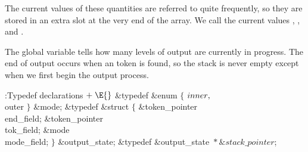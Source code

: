 \yskip\noindent The current values of these quantities are referred to
quite frequently, so they are stored in an extra slot at the very end of
the  array.  We call the current values , , and
.

The global variable  tells how many levels of output are
currently in progress. The end of output occurs when an 
token is found, so the stack is never empty except when we first begin the
output process.

\Y\B\4:Typedef declarations\X${}\mathrel+\E{}$\6
\&{typedef} \&{enum} ${}\{{}$\1\6
${}\\{inner},{}$%
\6
\\{outer}\2\6
${}\}{}$ \&{mode};\6
\&{typedef} \&{struct} ${}\{{}$\1\6
\&{token\_pointer} \\{end\_field};\6
\&{token\_pointer} \\{tok\_field};\6
\&{mode} \\{mode\_field};\2\6
${}\}{}$ \&{output\_state};\6
\&{typedef} \&{output\_state} ${}{*}\&{stack\_pointer}{}$;\par
\fi


